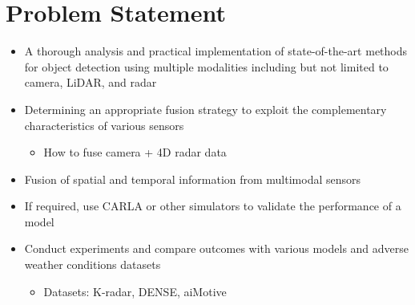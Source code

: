 \documentclass[rnd]{mas_proposal}
\begin{document}
\begin{itemize}
\end{itemize}

\section{Problem Statement}
\begin{itemize}




    \item A thorough analysis and practical implementation of state-of-the-art methods for object detection using multiple modalities including but not limited to camera, LiDAR, and radar

    \item Determining an appropriate fusion strategy to exploit the complementary characteristics of various sensors
          \begin{itemize}
              \item How to fuse camera + 4D radar data
          \end{itemize}

    \item Fusion of spatial and temporal information from multimodal sensors

    \item If required, use CARLA or other simulators to validate the performance of a model

    \item Conduct experiments and compare outcomes with various models and adverse weather conditions datasets
          \begin{itemize}
              \item Datasets: K-radar\cite{Paek2022Jun}, DENSE\cite{bijelic2020seeing}, aiMotive\cite{Matuszka2022Nov}
          \end{itemize}



\end{itemize}
\end{document}

